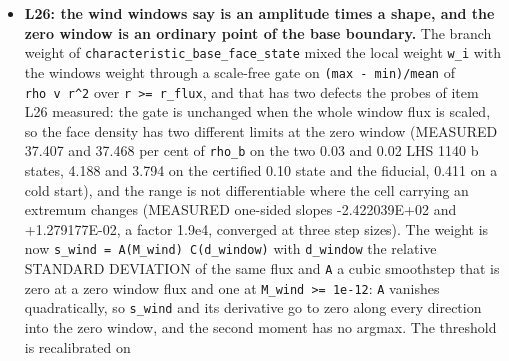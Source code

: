 \documentclass[english,a4paper]{my_memo}
\begin{document}
\begin{itemize}
  row falling from 7.82e-01 to 8.18e-06, and CERTIFIED at pass 12, while the
  coupled block reached trust-region iteration 14 and moved \texttt{\textbar{}\textbar{}R\textbar{}\textbar{}} by 0.6 per
  cent with all thirteen of its linear solves ending with the Krylov subspace
  exhausted, the L24 failure mode. The certified state beside the archived one:
  the He I 10830 equivalent width moves by one per cent (1.5599 against
  1.5754 \%A), log10 Mdot by 7.9024 against 7.9091, the H2 front by one cell and
  the base temperature by 3.7 per cent (778.79 K against 808.32). No handover fired in the three refusing cases within the
  passes they reached. The entry certification of all four reloaded states puts
  the hydrodynamic energy row five to six decades outside its tolerance, so
  none of them is a state whose carrier row alone refuses it and the two
  questions the increments were opened for are not answered by these runs. The
  three Newton fixtures with the key absent print the same number at every
  place both binaries printed one. No golden refreshed, no default changed.
\item
  \textbf{L26: the wind window\textquotesingle s say is an amplitude times a shape, and the zero
  window is an ordinary point of the base boundary.} The branch weight of
  \texttt{characteristic\_base\_face\_state} mixed the local weight \texttt{w\_i} with the
  window\textquotesingle s weight through a scale-free gate on \texttt{(max\ -\ min)/\textbar{}mean\textbar{}} of
  \texttt{rho\ v\ r\^{}2} over \texttt{r\ \textgreater{}=\ r\_flux}, and that has two defects the probes of item
  L26 measured: the gate is unchanged when the whole window flux is scaled, so
  the face density has two different limits at the zero window (MEASURED 37.407
  and 37.468 per cent of \texttt{rho\_b} on the two 0.03 and 0.02 LHS 1140 b states,
  4.188 and 3.794 on the certified 0.10 state and the fiducial, 0.411 on a cold
  start), and the range is not differentiable where the cell carrying an
  extremum changes (MEASURED one-sided slopes -2.422039E+02 and +1.279177E-02,
  a factor 1.9e4, converged at three step sizes). The weight is now
  \texttt{s\_wind\ =\ A(M\_wind)\ C(d\_window)} with \texttt{d\_window} the relative STANDARD
  DEVIATION of the same flux and \texttt{A} a cubic smoothstep that is zero at a zero
  window flux and one at \texttt{\textbar{}M\_wind\textbar{}\ \textgreater{}=\ 1e-12}: \texttt{A} vanishes quadratically, so
  \texttt{s\_wind} and its derivative go to zero along every direction into the zero
  window, and the second moment has no argmax. The threshold is recalibrated on

\end{itemize}
\end{document}
